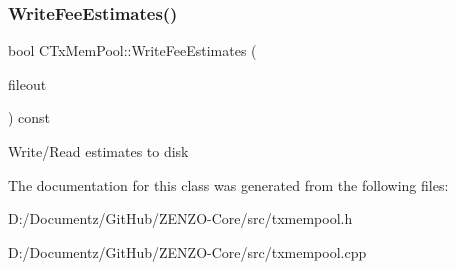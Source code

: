 \subsubsection{\texorpdfstring{WriteFeeEstimates()}{WriteFeeEstimates()}}
{\footnotesize\ttfamily bool C\+Tx\+Mem\+Pool\+::\+Write\+Fee\+Estimates (\begin{DoxyParamCaption}\item[{\mbox{\hyperlink{class_c_auto_file}{C\+Auto\+File}} \&}]{fileout }\end{DoxyParamCaption}) const}

Write/\+Read estimates to disk 

The documentation for this class was generated from the following files\+:\begin{DoxyCompactItemize}
\item 
D\+:/\+Documentz/\+Git\+Hub/\+Z\+E\+N\+Z\+O-\/\+Core/src/txmempool.\+h\item 
D\+:/\+Documentz/\+Git\+Hub/\+Z\+E\+N\+Z\+O-\/\+Core/src/txmempool.\+cpp\end{DoxyCompactItemize}
